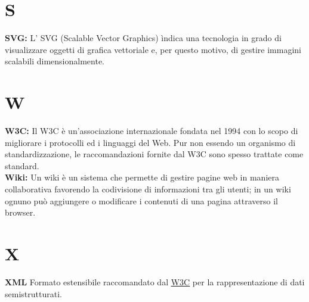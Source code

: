 \section*{S}
\hypertarget{svg}{}
\textbf{SVG:}
L' SVG (Scalable Vector Graphics) \` indica una tecnologia in grado di visualizzare oggetti di grafica vettoriale e, per questo motivo, di gestire immagini scalabili dimensionalmente.\\

\section*{W}
\hypertarget{w3c}{}
\textbf{W3C:}
Il W3C \`e un'associazione internazionale fondata nel 1994 con lo scopo di migliorare i protocolli ed i linguaggi del Web. Pur non essendo un organismo di standardizzazione, le raccomandazioni fornite dal W3C sono spesso trattate come standard.\\

\hypertarget{wiki}{}
\textbf{Wiki:}
Un wiki \`e un sistema che permette di gestire pagine web in maniera collaborativa favorendo la codivisione di informazioni tra gli utenti; in un wiki ognuno pu\`o aggiungere o modificare i contenuti di una pagina attraverso il browser.\\

\section*{X}
\hypertarget{xml}{}
\textbf{XML}
\text Formato estensibile raccomandato dal \hyperlink{w3c}{\underline{W3C}} per la rappresentazione di dati semistrutturati.\\


